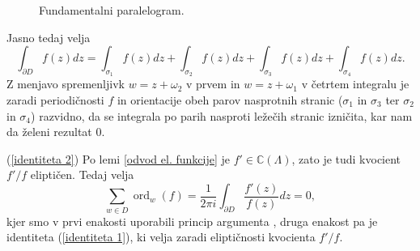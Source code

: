 \documentclass[mat1]{fmfdelo}
\numberwithin{equation}{section}
\newcommand{\C}{\mathbb C}
\newcommand{\om}{\omega}
\newcommand{\elf}{\C(\Lambda)}
\newcommand{\ord}[2]{\operatorname{ord}_{#1}(#2)}
\theoremstyle{definition}
\begin{document}
\begin{dokaz}
\begin{figure}[H]
        \caption{Fundamentalni paralelogram.}
        \label{fundamentalni paralelogram}
    \end{figure}


    Jasno tedaj velja
    \[
        \int_{\partial D} f(z)dz = \int_{\sigma_1} f(z)dz + \int_{\sigma_2} f(z)dz + \int_{\sigma_3} f(z)dz + \int_{\sigma_4} f(z)dz.
    \]
    Z menjavo spremenljivk $w = z + \om_2$ v prvem in $w = z + \om_1$ v četrtem integralu je zaradi periodičnosti $f$ in orientacije obeh parov nasprotnih stranic ($\sigma_1$ in $\sigma_3$ ter $\sigma_2$ in $\sigma_4$) razvidno, da se integrala po parih nasproti ležečih stranic izničita, kar nam da želeni rezultat $0$.
    
    (\ref{identiteta 2}) Po lemi \ref{odvod el. funkcije} je $f' \in \elf$, zato je tudi kvocient $f'/f$ eliptičen. Tedaj velja
    \[
        \sum_{w \in D} \ord{w}{f} = \frac{1}{2\pi i}\int_{\partial D} \frac{f'(z)}{f(z)}dz = 0, 
    \]
    kjer smo v prvi enakosti uporabili princip argumenta \cite[Izrek 72]{Globevnik}, druga enakost pa je identiteta (\ref{identiteta 1}), ki velja zaradi eliptičnosti kvocienta $f'/f$.


\end{dokaz}
\end{document}
